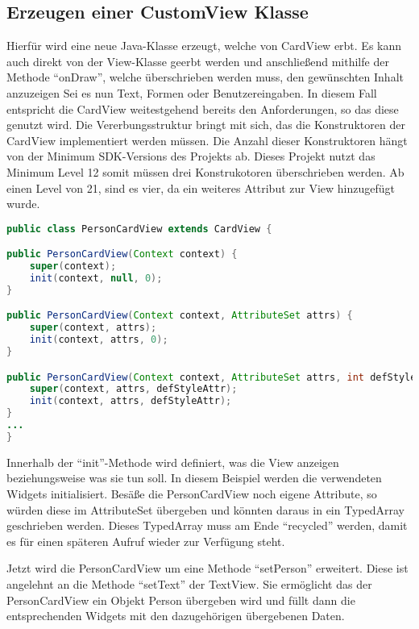 \subsection{Erzeugen einer CustomView Klasse}

Hierfür wird eine neue Java-Klasse erzeugt, welche von CardView erbt. Es kann auch direkt von der View-Klasse geerbt werden und anschließend mithilfe der Methode \enquote{onDraw}, welche überschrieben werden muss, den gewünschten Inhalt anzuzeigen Sei es nun Text, Formen oder Benutzereingaben.
In diesem Fall entspricht die CardView weitestgehend bereits den Anforderungen, so das diese genutzt wird.
Die Vererbungsstruktur bringt mit sich, das die Konstruktoren der CardView implementiert werden müssen.
Die Anzahl dieser Konstruktoren hängt von der Minimum SDK-Versions des Projekts ab. Dieses Projekt nutzt das Minimum Level 12 somit müssen drei Konstrukotoren überschrieben werden. Ab einen Level von 21, sind es vier, da ein weiteres Attribut zur View hinzugefügt wurde.

\begin{lstlisting}[label=lst:personCardView,
language=java,
firstnumber=1,
caption=Konstruktoren der PersonCardView]				   
public class PersonCardView extends CardView {

public PersonCardView(Context context) {
	super(context);
	init(context, null, 0);
}

public PersonCardView(Context context, AttributeSet attrs) {
	super(context, attrs);
	init(context, attrs, 0);
}

public PersonCardView(Context context, AttributeSet attrs, int defStyleAttr) {
	super(context, attrs, defStyleAttr);
	init(context, attrs, defStyleAttr);
}
...
}
\end{lstlisting}

Innerhalb der \enquote{init}-Methode wird definiert, was die View anzeigen beziehungsweise was sie tun soll. 
In diesem Beispiel werden die verwendeten Widgets initialisiert. Besäße die PersonCardView noch eigene Attribute, so würden diese im AttributeSet übergeben und könnten daraus in ein TypedArray geschrieben werden. Dieses TypedArray muss am Ende \enquote{recycled} werden, damit es für einen späteren Aufruf wieder zur Verfügung steht.

\newpage
Jetzt wird die PersonCardView um eine Methode \enquote{setPerson} erweitert. Diese ist angelehnt an die Methode \enquote{setText} der TextView. Sie ermöglicht das der PersonCardView ein Objekt Person übergeben wird und füllt dann die entsprechenden Widgets mit den dazugehörigen übergebenen Daten.

